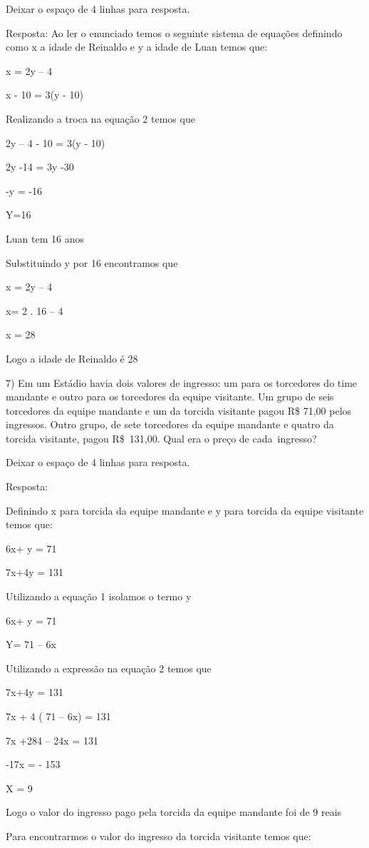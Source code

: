 Deixar o espaço de 4 linhas para resposta.

Resposta: Ao ler o enunciado temos o seguinte sistema de equações
definindo como x a idade de Reinaldo e y a idade de Luan temos que:

x = 2y -- 4

x - 10 = 3(y - 10)

Realizando a troca na equação 2 temos que

2y -- 4 - 10 = 3(y - 10)

2y -14 = 3y -30

-y = -16

Y=16

Luan tem 16 anos

Substituindo y por 16 encontramos que

x = 2y -- 4

x= 2 . 16 -- 4

x = 28

Logo a idade de Reinaldo é 28

7) Em um Estádio havia dois valores de ingresso: um para os torcedores
do time mandante e outro para os torcedores da equipe visitante. Um
grupo de seis torcedores da equipe mandante e um da torcida visitante
pagou R\$ 71,00 pelos ingressos. Outro grupo, de sete torcedores da
equipe mandante e quatro da torcida visitante, pagou R\$~131,00. Qual
era o preço de cada~ingresso?

Deixar o espaço de 4 linhas para resposta.

Resposta:

Definindo x para torcida da equipe mandante e y para torcida da equipe
visitante temos que:

6x+ y = 71

7x+4y = 131

Utilizando a equação 1 isolamos o termo y

6x+ y = 71

Y= 71 -- 6x

Utilizando a expressão na equação 2 temos que

7x+4y = 131

7x + 4 ( 71 -- 6x) = 131

7x +284 -- 24x = 131

-17x = - 153

X = 9

Logo o valor do ingresso pago pela torcida da equipe mandante foi de 9
reais

Para encontrarmos o valor do ingresso da torcida visitante temos que:

